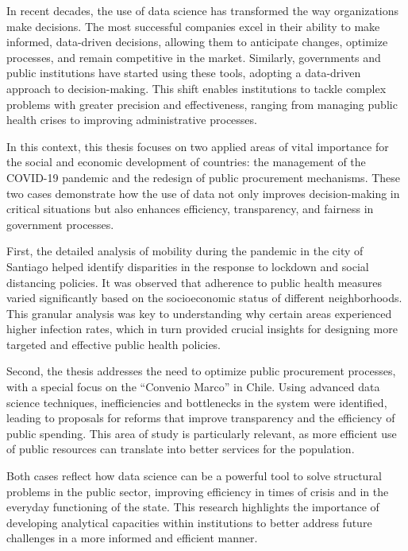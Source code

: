 

In recent decades, the use of data science has transformed the way organizations make decisions. The most successful companies excel in their ability to make informed, data-driven decisions, allowing them to anticipate changes, optimize processes, and remain competitive in the market. Similarly, governments and public institutions have started using these tools, adopting a data-driven approach to decision-making. This shift enables institutions to tackle complex problems with greater precision and effectiveness, ranging from managing public health crises to improving administrative processes.

In this context, this thesis focuses on two applied areas of vital importance for the social and economic development of countries: the management of the COVID-19 pandemic and the redesign of public procurement mechanisms. These two cases demonstrate how the use of data not only improves decision-making in critical situations but also enhances efficiency, transparency, and fairness in government processes.

First, the detailed analysis of mobility during the pandemic in the city of Santiago helped identify disparities in the response to lockdown and social distancing policies. It was observed that adherence to public health measures varied significantly based on the socioeconomic status of different neighborhoods. This granular analysis was key to understanding why certain areas experienced higher infection rates, which in turn provided crucial insights for designing more targeted and effective public health policies.

Second, the thesis addresses the need to optimize public procurement processes, with a special focus on the “Convenio Marco” in Chile. Using advanced data science techniques, inefficiencies and bottlenecks in the system were identified, leading to proposals for reforms that improve transparency and the efficiency of public spending. This area of study is particularly relevant, as more efficient use of public resources can translate into better services for the population.

Both cases reflect how data science can be a powerful tool to solve structural problems in the public sector, improving efficiency in times of crisis and in the everyday functioning of the state. This research highlights the importance of developing analytical capacities within institutions to better address future challenges in a more informed and efficient manner.
